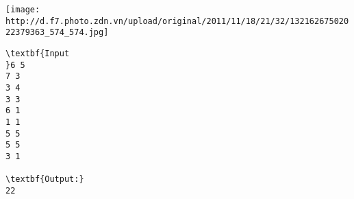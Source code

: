 \texttt{[image: http://d.f7.photo.zdn.vn/upload/original/2011/11/18/21/32/13216267502022379363\_574\_574.jpg]}
\begin{verbatim}
\textbf{Input
}6 5 
7 3 
3 4 
3 3 
6 1 
1 1 
5 5 
5 5 
3 1

\textbf{Output:}
22
\end{verbatim}